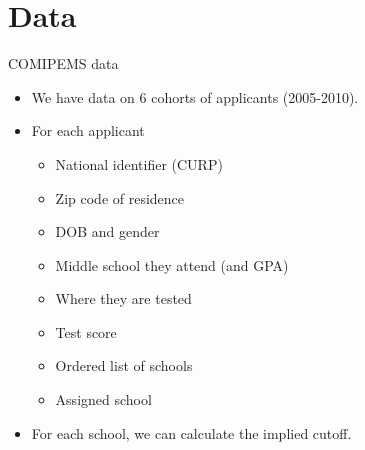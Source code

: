 \documentclass[notes,11pt, aspectratio=169]{beamer}
\begin{document}



\section{Data}



\begin{frame}{COMIPEMS data}
  \begin{itemize}
    \vfill\item We have data on 6 cohorts of applicants (2005-2010).
    \vfill\item For each applicant
      \begin{itemize}
      \vfill\item National identifier (CURP)
      \vfill\item Zip code of residence
      \vfill\item DOB and gender
      \vfill\item Middle school they attend (and GPA)
      \vfill\item Where they are tested
      \vfill\item Test score
      \vfill\item Ordered list of schools
      \vfill\item Assigned school
      \end{itemize}
          \vfill\item For each school, we can calculate the implied  cutoff.
  \end{itemize}
    
\end{frame}
\end{document}
